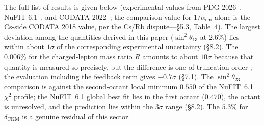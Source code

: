 \documentclass[12pt,a4paper]{article}
\begin{document}
The full list of results is given below (experimental values from PDG 2026~\cite{pdg}, NuFIT 6.1~\cite{nufit}, and CODATA 2022~\cite{codata}; the comparison value for $1/\alpha_\mathrm{em}$ alone is the Cs-side CODATA 2018 value, per the Cs/Rb dispute---\S5.3, Table~4). The largest deviation among the quantities derived in this paper ($\sin^2\!\theta_{13}$ at $2.6\%$) lies within about $1\sigma$ of the corresponding experimental uncertainty (\S8.2). The $0.006\%$ for the charged-lepton mass ratio $R$ amounts to about $10\sigma$ because that quantity is measured so precisely, but the difference is one of truncation order ; the evaluation including the feedback term gives $-0.7\sigma$ (\S7.1). The $\sin^2\!\theta_{23}$ comparison is against the second-octant local minimum $0.550$ of the NuFIT~6.1 $\chi^2$ profile; the NuFIT~6.1 global best fit lies in the first octant ($0.470$), the octant is unresolved, and the prediction lies within the $3\sigma$ range (\S8.2). The $5.3\%$ for $\delta_\mathrm{CKM}$ is a genuine residual of this sector.
\end{document}
